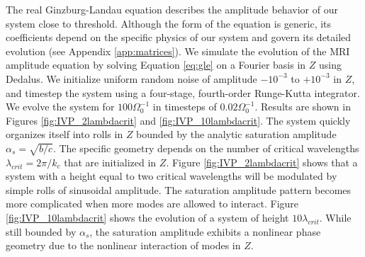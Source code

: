 \documentclass{emulateapj}
\begin{document}
The real Ginzburg-Landau equation describes the amplitude behavior of our system close to threshold. Although the form of the equation is generic, its coefficients depend on the specific physics of our system and govern its detailed evolution (see Appendix \ref{app:matrices}). We simulate the evolution of the MRI amplitude equation by solving Equation \ref{eq:gle} on a Fourier basis in $Z$ using Dedalus. We initialize uniform random noise of amplitude $-10^{-3}$ to $+10^{-3}$ in $Z$, and timestep the system using a four-stage, fourth-order Runge-Kutta integrator. We evolve the system for $100 \Omega_0^{-1}$ in timesteps of $0.02 \Omega_0^{-1}$. Results are shown in Figures \ref{fig:IVP_2lambdacrit} and \ref{fig:IVP_10lambdacrit}. The system quickly organizes itself into rolls in $Z$ bounded by the analytic saturation amplitude $\alpha_s = \sqrt{b/c}$. The specific geometry depends on the number of critical wavelengths $\lambda_{crit} = 2\pi/k_c$ that are initialized in $Z$. Figure \ref{fig:IVP_2lambdacrit} shows that a system with a height equal to two critical wavelengths will be modulated by simple rolls of sinusoidal amplitude. The saturation amplitude pattern becomes more complicated when more modes are allowed to interact. Figure \ref{fig:IVP_10lambdacrit} shows the evolution of a system of height $10 \lambda_{crit}$. While still bounded by $\alpha_s$, the saturation amplitude exhibits a nonlinear phase geometry due to the nonlinear interaction of modes in $Z$. 
\end{document}
